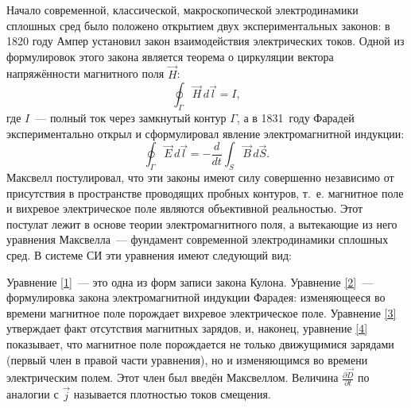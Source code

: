 


\newcommand*{\ddt}[1]{\frac{\partial #1}{\partial t}}

Начало современной, классической, макроскопической электродинамики сплошных сред было положено открытием двух
экспериментальных законов: в 1820 году Ампер установил закон взаимодействия электрических токов. Одной из формулировок
этого закона является теорема о циркуляции вектора напряжённости магнитного поля $\vec{H}$:
\[
\oint_{\Gamma}\vec{H}\,d\vec{l}=I,
\]
где $I$~--- полный ток через замкнутый контур $\Gamma$, а в 1831~году Фарадей экспериментально открыл и сформулировал
явление электромагнитной индукции:
\[
\oint_{\Gamma}\vec{E}\,d\vec{l}=-\frac{d}{dt}\int_S\vec{B}\, d\vec{S}.
\]
Максвелл постулировал, что эти законы имеют силу совершенно независимо от присутствия в пространстве проводящих пробных
контуров, т.~е. магнитное поле и вихревое электрическое поле являются объективной реальностью. Этот постулат лежит в
основе теории электромагнитного поля, а вытекающие из него уравнения Максвелла~--- фундамент современной электродинамики
сплошных сред. В системе СИ эти уравнения имеют следующий вид:



Уравнение \eqref{1}~--- это одна из форм записи закона Кулона. Уравнение \eqref{2}~--- формулировка закона
электромагнитной индукции Фарадея: изменяющееся во времени магнитное поле порождает вихревое электрическое поле.
Уравнение \eqref{3} утверждает факт отсутствия магнитных зарядов, и, наконец, уравнение \eqref{4} показывает, что магнитное поле
порождается не только движущимися зарядами (первый член в правой части уравнения), но и изменяющимся во времени
электрическим полем. Этот член был введён Максвеллом. Величина $\ddt{\vec{D}}$ по аналогии с $\vec{j}$ называется плотностью
токов смещения.

